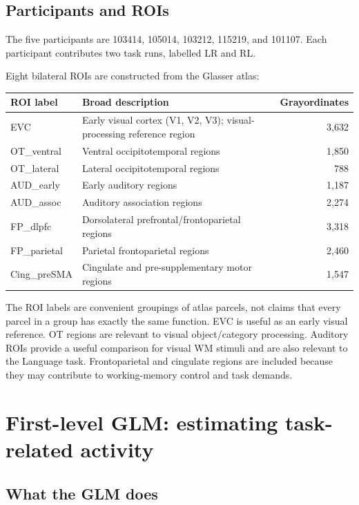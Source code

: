 \documentclass[11pt,a4paper]{article}
\begin{document}
\subsection{Participants and ROIs}

The five participants are 103414, 105014, 103212, 115219, and 101107. Each participant contributes two task runs, labelled LR and RL.

Eight bilateral ROIs are constructed from the Glasser atlas:

\begin{longtable}{p{}p{}r}
\toprule
\textbf{ROI label} & \textbf{Broad description} & \textbf{Grayordinates}\\
\midrule
EVC & Early visual cortex (V1, V2, V3); visual-processing reference region & 3,632\\
OT\_ventral & Ventral occipitotemporal regions & 1,850\\
OT\_lateral & Lateral occipitotemporal regions & 788\\
AUD\_early & Early auditory regions & 1,187\\
AUD\_assoc & Auditory association regions & 2,274\\
FP\_dlpfc & Dorsolateral prefrontal/frontoparietal regions & 3,318\\
FP\_parietal & Parietal frontoparietal regions & 2,460\\
Cing\_preSMA & Cingulate and pre-supplementary motor regions & 1,547\\
\bottomrule
\end{longtable}

The ROI labels are convenient groupings of atlas parcels, not claims that every parcel in a group has exactly the same function. EVC is useful as an early visual reference. OT regions are relevant to visual object/category processing. Auditory ROIs provide a useful comparison for visual WM stimuli and are also relevant to the Language task. Frontoparietal and cingulate regions are included because they may contribute to working-memory control and task demands.

\section{First-level GLM: estimating task-related activity}

\subsection{What the GLM does}
\end{document}
